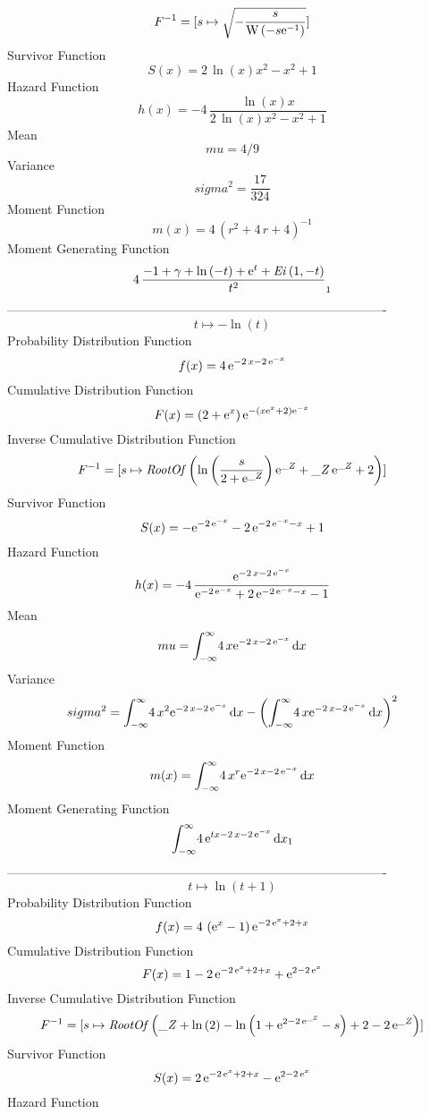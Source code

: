 \documentclass[12pt]{article}
\begin{document}
  $$F^{-1} = [s\mapsto \sqrt {-{\frac {s}{{\rm W} \left(-s{{\rm e}^{-1}}\right)}}}]
$$Survivor Function 
 $$ S(x)=2\,\ln  \left( x \right) {x}^{2}-{x}^{2}+1
$$ Hazard Function 
 $$ h(x)=-4\,{\frac {\ln  \left( x \right) x}{2\,\ln  \left( x \right) {x}^{2}-
{x}^{2}+1}}
$$Mean 
 $$ mu=4/9
$$ Variance 
 $$ sigma^2 = {\frac{17}{324}}
$$Moment Function 
 $$ m(x) = 4\, \left( {r}^{2}+4\,r+4 \right) ^{-1}
$$ Moment Generating Function 
 $$4\,{\frac {-1+\gamma+\ln  \left( -t \right) +{{\rm e}^{t}}+{\it Ei}
 \left( 1,-t \right) }{{t}^{2}}}_{{1}}
$$-------------------------------------------------------------------------------------------  \\$$t\mapsto -\ln  \left( t \right) 
$$Probability Distribution Function 
$$  f(x)=4\,{{\rm e}^{-2\,x-2\,{{\rm e}^{-x}}}}
$$Cumulative Distribution Function  
 $$F(x)= \left( 2+{{\rm e}^{x}} \right) {{\rm e}^{- \left( x{{\rm e}^{x}}+2
 \right) {{\rm e}^{-x}}}}
$$ Inverse Cumulative Distribution Function 
  $$F^{-1} = [s\mapsto {\it RootOf} \left( \ln  \left( {\frac {s}{2+{{\rm e}^{{\it 
\_Z}}}}} \right) {{\rm e}^{{\it \_Z}}}+{\it \_Z}\,{{\rm e}^{{\it \_Z}}
}+2 \right) ]
$$Survivor Function 
 $$ S(x)=-{{\rm e}^{-2\,{{\rm e}^{-x}}}}-2\,{{\rm e}^{-2\,{{\rm e}^{-x}}-x}}+1
$$ Hazard Function 
 $$ h(x)=-4\,{\frac {{{\rm e}^{-2\,x-2\,{{\rm e}^{-x}}}}}{{{\rm e}^{-2\,{
{\rm e}^{-x}}}}+2\,{{\rm e}^{-2\,{{\rm e}^{-x}}-x}}-1}}
$$Mean 
 $$ mu=\int_{-\infty }^{\infty }\!4\,x{{\rm e}^{-2\,x-2\,{{\rm e}^{-x}}}}
\,{\rm d}x
$$ Variance 
 $$ sigma^2 = \int_{-\infty }^{\infty }\!4\,{x}^{2}{{\rm e}^{-2\,x-2\,{{\rm e}^{-x}}
}}\,{\rm d}x- \left( \int_{-\infty }^{\infty }\!4\,x{{\rm e}^{-2\,x-2
\,{{\rm e}^{-x}}}}\,{\rm d}x \right) ^{2}
$$Moment Function 
 $$ m(x) = \int_{-\infty }^{\infty }\!4\,{x}^{r}{{\rm e}^{-2\,x-2\,{{\rm e}^{-x}}
}}\,{\rm d}x
$$ Moment Generating Function 
 $$\int_{-\infty }^{\infty }\!4\,{{\rm e}^{tx-2\,x-2\,{{\rm e}^{-x}}}}
\,{\rm d}x_{{1}}
$$-------------------------------------------------------------------------------------------  \\$$t\mapsto \ln  \left( t+1 \right) 
$$Probability Distribution Function 
$$  f(x)=4\, \left( {{\rm e}^{x}}-1 \right) {{\rm e}^{-2\,{{\rm e}^{x}}+2+x}}
$$Cumulative Distribution Function  
 $$F(x)=1-2\,{{\rm e}^{-2\,{{\rm e}^{x}}+2+x}}+{{\rm e}^{2-2\,{{\rm e}^{x}}}}
$$ Inverse Cumulative Distribution Function 
  $$F^{-1} = [s\mapsto {\it RootOf} \left( {\it \_Z}+\ln  \left( 2 \right) -\ln 
 \left( 1+{{\rm e}^{2-2\,{{\rm e}^{{\it \_Z}}}}}-s \right) +2-2\,{
{\rm e}^{{\it \_Z}}} \right) ]
$$Survivor Function 
 $$ S(x)=2\,{{\rm e}^{-2\,{{\rm e}^{x}}+2+x}}-{{\rm e}^{2-2\,{{\rm e}^{x}}}}
$$ Hazard Function 
\end{document}
